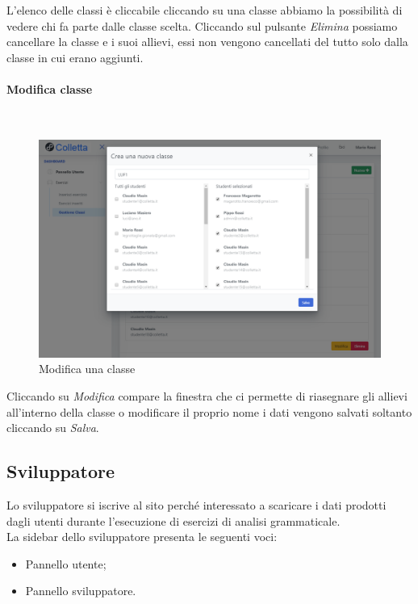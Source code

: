         	
 L'elenco delle classi è cliccabile cliccando su una classe abbiamo la possibilità di vedere chi fa parte dalle classe scelta. Cliccando sul pulsante \textit{Elimina} possiamo cancellare la classe e i suoi allievi, essi non vengono cancellati del tutto solo dalla classe in cui erano aggiunti.         
       
       \newpage
         \paragraph{Modifica classe}\mbox{}\\	      
        
         \begin{figure}[H]
            	\centering
        		\includegraphics[width=17cm]{sez/img/insegnante/modificaclasse.PNG} 
            	\caption{Modifica una classe}\label{fig:1}
        	\end{figure}
        	
        	
Cliccando su \textit{Modifica} compare la finestra che ci permette di riasegnare gli allievi all'interno della classe o modificare il proprio nome i dati vengono salvati soltanto cliccando su \textit{Salva}.
        
	\newpage
    \subsection{Sviluppatore}
    Lo sviluppatore si iscrive al sito perché interessato a scaricare i dati prodotti dagli utenti durante l'esecuzione di esercizi di analisi grammaticale.
    	 \\La sidebar dello sviluppatore presenta le seguenti voci:
    		\begin{itemize}
    			\item Pannello utente;
    			\item Pannello sviluppatore.
    		\end{itemize}
    
